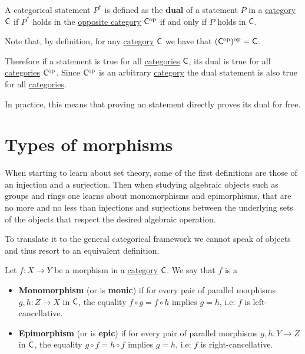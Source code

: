 \documentclass[../../main]{subfiles}
\begin{document}
A categorical statement \(P^{\ast}\) is defined as the \textbf{dual} of a statement \(P\) in a \hyperref[def:category]{category} \(\mathsf{C}\) if \(P^{\ast}\) holds in the \hyperref[def:opposite-category]{opposite category} \(\mathsf{C}^{\operatorname*{op}}\) if and only if \(P\) holds in \(\mathsf{C}\).

Note that, by definition, for any \hyperref[def:category]{category} \(\mathsf{C}\) we have that \((\mathsf{C}^{\operatorname*{op}})^{\operatorname*{op}} = \mathsf{C}\).

Therefore if a statement is true for all \hyperref[def:category]{categories} \(\mathsf{C}\), its dual is true for all \hyperref[def:category]{categories} \(\mathsf{C}^{\operatorname*{op}}\).
Since \(\mathsf{C}^{\operatorname*{op}}\) is an arbitrary \hyperref[def:category]{category} the dual statement is also true for all \hyperref[def:category]{categories}.

In practice, this means that proving an statement directly proves its dual for free.

\section{Types of morphisms}


When starting to learn about set theory, some of the first definitions are those of an injection and a surjection.
Then when studying algebraic objects such as groups and rings one learns about monomorphisms and epimorphisms, that are no more and no less than injections and surjections between the underlying sets of the objects that respect the desired algebraic operation.

To translate it to the general categorical framework we cannot speak of objects and thus resort to an equivalent definition.
\begin{definition}\label{def:mono-epi-morphism}
  Let \(f\colon X \to Y\) be a morphism in a \hyperref[def:category]{category} \(\mathsf{C}\).
  We say that \(f\) is a
  \begin{itemize}
    \item \textbf{Monomorphism} (or is \textbf{monic}) if for every pair of parallel morphisms \(g, h\colon Z \to X\) in \(\mathsf{C}\), the equality \(f \circ g = f \circ h\) implies \(g = h\), i.e: \(f\) is left-cancellative.
    \item \textbf{Epimorphism} (or is \textbf{epic}) if for every pair of parallel morphisms \(g, h\colon Y \to Z\) in \(\mathsf{C}\), the equality \(g \circ f = h \circ f\) implies \(g = h\), i.e: \(f\) is right-cancellative.
  \end{itemize}
\end{definition}
\end{document}
